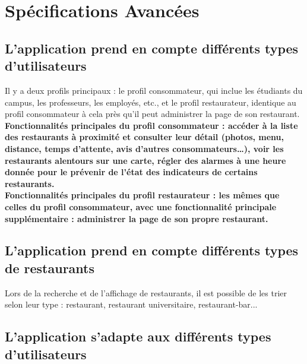 \section{Spécifications Avancées}

\subsection{L'application prend en compte différents types d'utilisateurs}

Il y a deux profils principaux : le profil consommateur, qui inclue les étudiants du campus, les professeurs, les employés, etc., et le profil restaurateur, identique au profil consommateur à cela près qu'il peut administrer la page de son restaurant. \\
\bf{Fonctionnalités principales du profil consommateur :} accéder à la liste des restaurants à proximité et consulter leur détail (photos, menu, distance, temps d'attente, avis d'autres consommateurs\dots), voir les restaurants alentours sur une carte, régler des alarmes à une heure donnée pour le prévenir de l'état des indicateurs de certains restaurants. \\
\bf{Fonctionnalités principales du profil restaurateur :} les mêmes que celles du profil consommateur, avec une fonctionnalité principale supplémentaire : administrer la page de son propre restaurant.\\

\subsection{L'application prend en compte différents types de restaurants}

Lors de la recherche et de l'affichage de restaurants, il est possible de les trier selon leur type : restaurant, restaurant universitaire, restaurant-bar...

\subsection{L'application s'adapte aux différents types d'utilisateurs}

